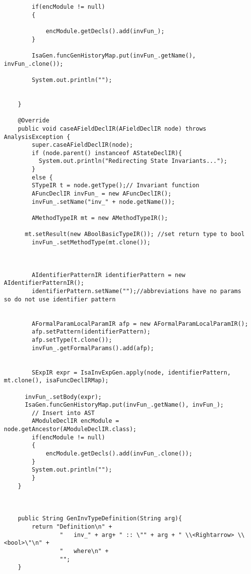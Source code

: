 \begin{appendices}
\begin{lstlisting}
        if(encModule != null)
        {
          
            encModule.getDecls().add(invFun_);
        }

        IsaGen.funcGenHistoryMap.put(invFun_.getName(), invFun_.clone());
        
        System.out.println("");

        
    }
    
    @Override
    public void caseAFieldDeclIR(AFieldDeclIR node) throws AnalysisException {
        super.caseAFieldDeclIR(node);
        if (node.parent() instanceof AStateDeclIR){
          System.out.println("Redirecting State Invariants...");
        }
        else {
        STypeIR t = node.getType();// Invariant function
        AFuncDeclIR invFun_ = new AFuncDeclIR();
        invFun_.setName("inv_" + node.getName());
        
        AMethodTypeIR mt = new AMethodTypeIR();
        
      mt.setResult(new ABoolBasicTypeIR()); //set return type to bool
        invFun_.setMethodType(mt.clone());
      
        

        AIdentifierPatternIR identifierPattern = new AIdentifierPatternIR();
        identifierPattern.setName("");//abbreviations have no params so do not use identifier pattern
        
        
        AFormalParamLocalParamIR afp = new AFormalParamLocalParamIR();
        afp.setPattern(identifierPattern);
        afp.setType(t.clone()); 
        invFun_.getFormalParams().add(afp);
      
        
        SExpIR expr = IsaInvExpGen.apply(node, identifierPattern, mt.clone(), isaFuncDeclIRMap);
        
      invFun_.setBody(expr);
      IsaGen.funcGenHistoryMap.put(invFun_.getName(), invFun_);
        // Insert into AST
        AModuleDeclIR encModule = node.getAncestor(AModuleDeclIR.class);
        if(encModule != null)
        {
            encModule.getDecls().add(invFun_.clone());
        }
        System.out.println("");
        }
    }
    
   

    public String GenInvTypeDefinition(String arg){
        return "Definition\n" +
                "   inv_" + arg+ " :: \"" + arg + " \\<Rightarrow> \\<bool>\"\n" +
                "   where\n" +
                "";
    }


\end{lstlisting}
\end{appendices}

